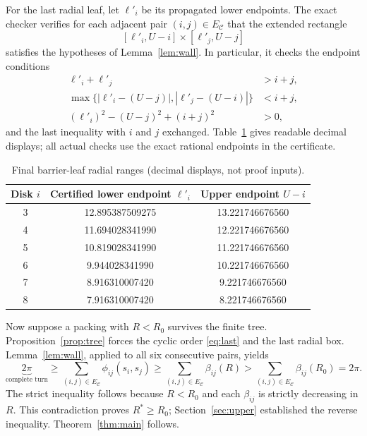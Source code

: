 \documentclass[10pt,a4paper]{article}
\newcommand{\Rcrit}{R_0}
\newcommand{\Rcap}{U}
\begin{document}
For the last radial leaf, let $\ell'_i$ be its propagated lower endpoints. The exact checker verifies for each adjacent pair $(i,j)\in E_{\mathcal C}$ that the extended rectangle
\[
 [\ell'_i,\Rcap-i]\times[\ell'_j,\Rcap-j]
\]
satisfies the hypotheses of Lemma~\ref{lem:wall}. In particular, it checks the endpoint conditions
\begin{align*}
 \ell'_i+\ell'_j&>i+j,\\
 \max\bigl\{|\ell'_i-(\Rcap-j)|,|\ell'_j-(\Rcap-i)|\bigr\}&<i+j,\\
 (\ell'_i)^2-(\Rcap-j)^2+(i+j)^2&>0,
\end{align*}
and the last inequality with $i$ and $j$ exchanged. Table~\ref{tab:intervals} gives readable decimal displays; all actual checks use the exact rational endpoints in the certificate.

\begin{table}[htbp]\centering\small
\caption{Final barrier-leaf radial ranges (decimal displays, not proof inputs).}\label{tab:intervals}
\begin{tabular}{ccc}\toprule
Disk $i$ & Certified lower endpoint $\ell'_i$ & Upper endpoint $\Rcap-i$\\\midrule
3&12.895387509275&13.221746676560\\
4&11.694028341990&12.221746676560\\
5&10.819028341990&11.221746676560\\
6&9.944028341990&10.221746676560\\
7&8.916310007420&9.221746676560\\
8&7.916310007420&8.221746676560\\
\bottomrule\end{tabular}
\end{table}

Now suppose a packing with $R<\Rcrit$ survives the finite tree. Proposition~\ref{prop:tree} forces the cyclic order \eqref{eq:last} and the last radial box. Lemma~\ref{lem:wall}, applied to all six consecutive pairs, yields
\begin{equation}\label{eq:contradiction}
 \underbrace{2\pi}_{\text{complete turn}}
 \ge\sum_{(i,j)\in E_{\mathcal C}}\phi_{ij}(s_i,s_j)
 \ge\sum_{(i,j)\in E_{\mathcal C}}\beta_{ij}(R)
 >\sum_{(i,j)\in E_{\mathcal C}}\beta_{ij}(\Rcrit)=2\pi.
\end{equation}
The strict inequality follows because $R<\Rcrit$ and each $\beta_{ij}$ is strictly decreasing in $R$. This contradiction proves $R^*\ge\Rcrit$; Section~\ref{sec:upper} established the reverse inequality. Theorem~\ref{thm:main} follows.
\end{document}
